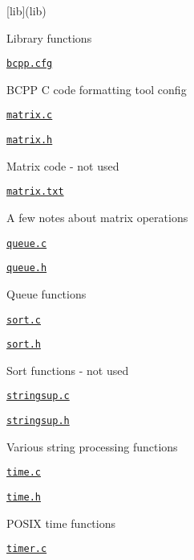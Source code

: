 \begin{DoxyItemize}
\item \mbox{[}lib\mbox{]}(lib)
\begin{DoxyItemize}
\item Library functions
\item \href{lib/bcpp.cfg}{\tt bcpp.\+cfg}
\begin{DoxyItemize}
\item B\+C\+PP C code formatting tool config
\end{DoxyItemize}
\item \href{lib/matrix.c}{\tt matrix.\+c}
\item \href{lib/matrix.h}{\tt matrix.\+h}
\begin{DoxyItemize}
\item Matrix code -\/ not used
\end{DoxyItemize}
\item \href{lib/matrix.txt}{\tt matrix.\+txt}
\begin{DoxyItemize}
\item A few notes about matrix operations
\end{DoxyItemize}
\item \href{lib/queue.c}{\tt queue.\+c}
\item \href{lib/queue.h}{\tt queue.\+h}
\begin{DoxyItemize}
\item Queue functions
\end{DoxyItemize}
\item \href{lib/sort.c}{\tt sort.\+c}
\item \href{lib/sort.h}{\tt sort.\+h}
\begin{DoxyItemize}
\item Sort functions -\/ not used
\end{DoxyItemize}
\item \href{lib/stringsup.c}{\tt stringsup.\+c}
\item \href{lib/stringsup.h}{\tt stringsup.\+h}
\begin{DoxyItemize}
\item Various string processing functions
\end{DoxyItemize}
\item \href{lib/time.c}{\tt time.\+c}
\item \href{lib/time.h}{\tt time.\+h}
\begin{DoxyItemize}
\item P\+O\+S\+IX time functions
\end{DoxyItemize}
\item \href{lib/timer.c}{\tt timer.\+c}

\end{DoxyItemize}
\end{DoxyItemize}
